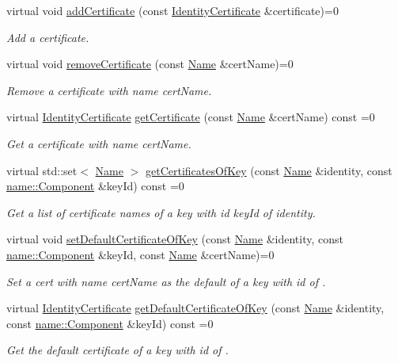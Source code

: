 \begin{DoxyCompactItemize}
virtual void \hyperlink{classndn_1_1security_1_1PibImpl_a7c2ee99dae327ec8c6f20cb909e50fbe}{add\+Certificate} (const \hyperlink{classndn_1_1IdentityCertificate}{Identity\+Certificate} \&certificate)=0
\begin{DoxyCompactList}\small\item\em Add a certificate. \end{DoxyCompactList}\item 
virtual void \hyperlink{classndn_1_1security_1_1PibImpl_ae2a84a71d94aeeb2c83c097a433bfb80}{remove\+Certificate} (const \hyperlink{classndn_1_1Name}{Name} \&cert\+Name)=0
\begin{DoxyCompactList}\small\item\em Remove a certificate with name {\ttfamily cert\+Name}. \end{DoxyCompactList}\item 
virtual \hyperlink{classndn_1_1IdentityCertificate}{Identity\+Certificate} \hyperlink{classndn_1_1security_1_1PibImpl_a19d80904297b854b7acea9f4f0639643}{get\+Certificate} (const \hyperlink{classndn_1_1Name}{Name} \&cert\+Name) const =0
\begin{DoxyCompactList}\small\item\em Get a certificate with name {\ttfamily cert\+Name}. \end{DoxyCompactList}\item 
virtual std\+::set$<$ \hyperlink{classndn_1_1Name}{Name} $>$ \hyperlink{classndn_1_1security_1_1PibImpl_a2d96fb04107cf46175a87bf14cb8a253}{get\+Certificates\+Of\+Key} (const \hyperlink{classndn_1_1Name}{Name} \&identity, const \hyperlink{classndn_1_1name_1_1Component}{name\+::\+Component} \&key\+Id) const =0
\begin{DoxyCompactList}\small\item\em Get a list of certificate names of a key with id {\ttfamily key\+Id} of {\ttfamily identity}. \end{DoxyCompactList}\item 
virtual void \hyperlink{classndn_1_1security_1_1PibImpl_aef78d5cbcdc4f844129525462cd30097}{set\+Default\+Certificate\+Of\+Key} (const \hyperlink{classndn_1_1Name}{Name} \&identity, const \hyperlink{classndn_1_1name_1_1Component}{name\+::\+Component} \&key\+Id, const \hyperlink{classndn_1_1Name}{Name} \&cert\+Name)=0
\begin{DoxyCompactList}\small\item\em Set a cert with name {\ttfamily cert\+Name} as the default of a key with id  of . \end{DoxyCompactList}\item 
virtual \hyperlink{classndn_1_1IdentityCertificate}{Identity\+Certificate} \hyperlink{classndn_1_1security_1_1PibImpl_a01968d8140cffa5093988db879d09f96}{get\+Default\+Certificate\+Of\+Key} (const \hyperlink{classndn_1_1Name}{Name} \&identity, const \hyperlink{classndn_1_1name_1_1Component}{name\+::\+Component} \&key\+Id) const =0
\begin{DoxyCompactList}\small\item\em Get the default certificate of a key with id  of . \end{DoxyCompactList}\end{DoxyCompactItemize}


